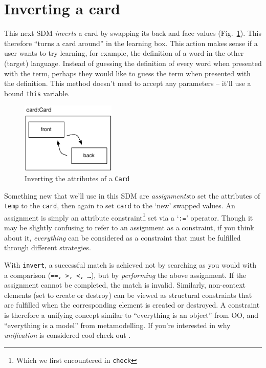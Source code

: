 \newpage
\hypertarget{sec:invertCard}{}
\section{Inverting a card}
\genHeader

This next SDM \emph{inverts} a card by swapping its back and face values (Fig.~\ref{fig:goal_invert}). This therefore ``turns a card around'' in the learning
box. This action makes sense if a user wants to try learning, for example, the definition of a word in the other (target) language. Instead of guessing the
definition of every word when presented with the term, perhaps they would like to guess the term when presented with the definition. This method doesn't need to
accept any parameters -- it'll use a bound \texttt{this} variable.

\vspace{0.5cm}

\begin{figure}[htbp]
	\centering
    \includegraphics[width=0.4\textwidth]{goal_invert.pdf}
 	\caption{Inverting the attributes of a \texttt{Card}}
 	\label{fig:goal_invert}
\end{figure}
\FloatBarrier

Something new that we'll use in this SDM are \emph{assignments}to set the attributes of \texttt{temp} to the \texttt{card}, then again to
set \texttt{card} to the `new' swapped values. An assignment is simply an attribute constraint\footnote{Which we first encountered in \texttt{check}} set via a
`\texttt{:=}' operator. Though it may be slightly confusing to refer to an assignment as a constraint, if you think about it, \emph{everything} can be
considered as a constraint that must be fulfilled through different strategies.

With \texttt{invert}, a successful match is achieved not by searching as you would with a comparison (\texttt{==, >, <, \ldots}), but by \emph{performing} the
above assignment. If the assignment cannot be completed, the match is invalid. Similarly, non-context elements (set to create or destroy) can be viewed as
structural constraints that are fulfilled when the corresponding element is created or destroyed.  A constraint is therefore a unifying concept similar to
``everything is an object'' from OO, and ``everything is a model'' from metamodelling.  If you're interested in why \emph{unification} is considered cool check
out \cite{BEZ05}.








